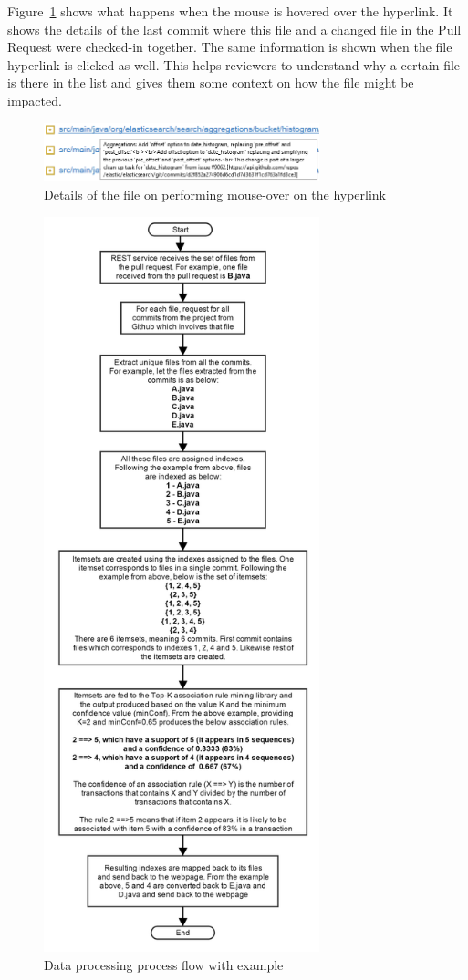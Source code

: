 Figure~\ref{fig:mouseOverOnFile} shows what happens when the mouse is hovered over the hyperlink. It shows the details of the last commit where this file and a changed file in the Pull Request were checked-in together. The same information is shown when the file hyperlink is clicked as well. This helps reviewers to understand why a certain file is there in the list and gives them some context on how the file might be impacted.


\begin{figure}[ht!]
\centering
\includegraphics[width=8cm]{MouseOverOfFile}
\caption{Details of the file on performing mouse-over on the hyperlink}
\label{fig:mouseOverOnFile}
\end{figure}

\begin{figure}[ht!]
\includegraphics[width=8cm]{data_processing_spmf}
\caption{Data processing process flow with example}
\label{fig:data_processing_spmf}
\end{figure}

